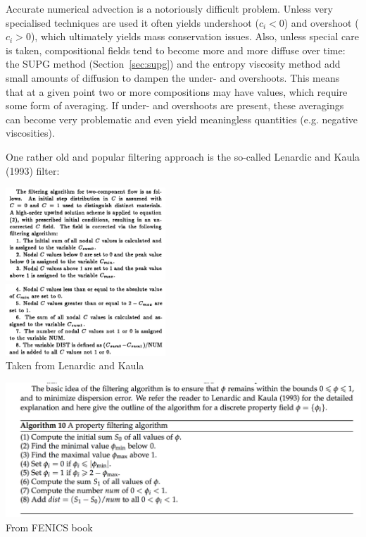 Accurate numerical advection is a notoriously difficult problem. Unless very specialised 
techniques are used it often yields undershoot ($c_i<0$) and overshoot ($c_i>0$), which 
ultimately yields mass conservation issues. Also, unless special care is taken, 
compositional fields tend to become more and more diffuse over time: the SUPG method (Section~\ref{sec:supg})
and the entropy viscosity method \cite{krhb12,ropu19} add small amounts of diffusion to dampen the under- and 
overshoots. This means that at a given point two or more compositions may have values, 
which require some form of averaging. If under- and overshoots are present, these averagings
can become very problematic and even yield meaningless quantities (e.g. negative viscosities).

One rather old and popular filtering approach is the so-called Lenardic and Kaula (1993) \cite{leka93}
filter:

\begin{center}
\includegraphics[width=6cm]{images/compositions/leka93_filter1}\\
\includegraphics[width=6cm]{images/compositions/leka93_filter2}\\
{\captionfont Taken from Lenardic and Kaula \cite{leka93}}
\end{center}

\begin{center}
\includegraphics[width=16cm]{images/compositions/leka93_filter3}\\
{\captionfont From FENICS book}
\end{center}



